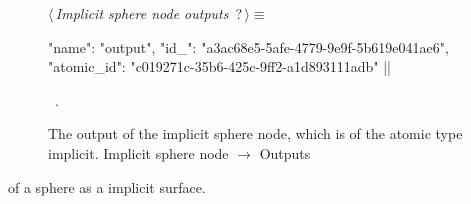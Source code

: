 \documentclass[%
    a4paper,    %
    justified,  %
    nobib,      %
    openany     %
]{tufte-book}
\begin{document}
\begin{figure}
\begin{flushleft} \small
\begin{minipage}{\linewidth}\label{scrap101}\raggedright\small
{} $\langle\,${\itshape Implicit sphere node outputs}\nobreak\ {\footnotesize {?}}$\,\rangle\equiv$
\vspace{-1ex}
\begin{pythoncode}
{
    "name": "output",
    "id_": "a3ac68e5-5afe-4779-9e9f-5b619e041ae6",
    "atomic_id": "c019271c-35b6-425c-9ff2-a1d893111adb"
}|\NWsep|
\end{pythoncode}
\vspace{1.5ex}
\footnotesize
\begin{list}{}{\setlength{\itemsep}{-\parsep}\setlength{\itemindent}{-\leftmargin}}
\item \NWtxtMacroRefIn\ .

\item{}
\end{list}
\end{minipage}\vspace{4ex}
\end{flushleft}
\caption{The output of the implicit sphere node, which is of the atomic type
  implicit.
  \newline{}\newline{}Implicit sphere node $\rightarrow$ Outputs}
\label{editor:lst:nodes:sphere-node:outputs:implicit}
\end{figure}

 of a sphere
as a implicit surface.
\end{document}
